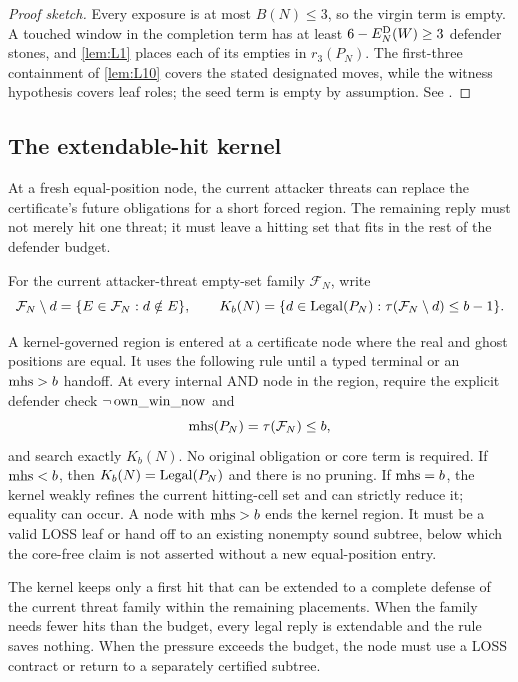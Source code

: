 \begin{proof}[Proof sketch]
Every exposure is at most $B(N)\le3$, so the virgin term is empty.  A touched
window in the completion term has at least $6-E_N^{\mathrm{D}}(W)\ge3$ defender stones,
and \cref{lem:L1} places each of its empties in $r_3(P_N)$.  The first-three
containment of \cref{lem:L10} covers the stated designated moves, while the
witness hypothesis covers leaf roles; the seed term is empty by assumption.
See \cite{hexobot-companions}.
\end{proof}

\subsection{The extendable-hit kernel}

At a fresh equal-position node, the current attacker threats can replace the
certificate's future obligations for a short forced region.  The remaining
reply must not merely hit one threat; it must leave a hitting set that fits in
the rest of the defender budget.

For the current attacker-threat empty-set family $\mathcal F_N$, write
\[
 \mathcal F_N\setminus d=\{E\in\mathcal F_N:d\notin E\},
 \qquad
 K_b(N)=\{d\in\operatorname{Legal}(P_N):
               \tau(\mathcal F_N\setminus d)\le b-1\}.
\]

\begin{theorem}
\label{thm:T6}
\upshape
A kernel-governed region is entered at a certificate node where the real and
ghost positions are equal.  It uses the following rule until a typed terminal
or an $\operatorname{mhs}>b$ handoff.  At every internal AND node in the region, require the
explicit defender check $\neg\operatorname{own\_win\_now}$ and
\[
 \operatorname{mhs}(P_N)=\tau(\mathcal F_N)\le b,
\]
and search exactly $K_b(N)$.  No original obligation or core term is required.
If $\operatorname{mhs}<b$, then $K_b(N)=\operatorname{Legal}(P_N)$ and there is no pruning.  If
$\operatorname{mhs}=b$, the kernel weakly refines the current hitting-cell set and can
strictly reduce it; equality can occur.  A node with $\operatorname{mhs}>b$ ends the kernel
region.  It must be a valid LOSS leaf or hand off to an existing nonempty
sound subtree, below which the core-free claim is not asserted without a new
equal-position entry.
\end{theorem}

\begin{plainterms}
The kernel keeps only a first hit that can be extended to a complete defense
of the current threat family within the remaining placements.  When the
family needs fewer hits than the budget, every legal reply is extendable and
the rule saves nothing.  When the pressure exceeds the budget, the node must
use a LOSS contract or return to a separately certified subtree.
\end{plainterms}

